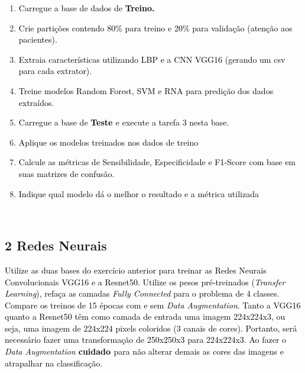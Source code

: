 \begin{enumerate}[series=listWWNumxxiv,label=\alph*),ref=\alph*]
\item \textcolor{black}{Carregue a base de dados de }\textbf{\textcolor{black}{Treino.}}\textcolor{black}{ }
\item \textcolor{black}{Crie partições contendo 80\% para treino e 20\% para validação (atenção aos
pacientes).}\textcolor{black}{ }
\item \textcolor{black}{Extraia características utilizando LBP e a CNN VGG16 (gerando um csv para cada
extrator).}\textcolor{black}{ }
\item \textcolor{black}{Treine modelos Random Forest, SVM e RNA para predição dos dados extraídos.}\textcolor{black}{ }
\item \textcolor{black}{Carregue a base de }\textbf{\textcolor{black}{Teste }}\textcolor{black}{ e execute a tarefa 3
nesta base.}\textcolor{black}{ }
\item \textcolor{black}{Aplique os modelos treinados nos dados de treino}\textcolor{black}{ }
\item \textcolor{black}{Calcule as métricas de Sensibilidade, Especificidade e F1-Score com base em suas matrizes de
confusão.}\textcolor{black}{ }
\item \textcolor{black}{Indique qual modelo dá o melhor o resultado e a métrica utilizada}\textcolor{black}{ }
\end{enumerate}
\textcolor{black}{ }

\subsection*{\textbf{2 Redes Neurais}}

\textcolor{black}{Utilize as duas bases do exercício anterior para treinar as Redes Neurais Convolucionais VGG16 e a
Resnet50. Utilize os pesos pré-treinados (}\textit{\textcolor{black}{Transfer Learning}}\textcolor{black}{), refaça as
camadas }\textit{\textcolor{black}{Fully Connected}}\textcolor{black}{ para o problema de 4 classes. Compare os treinos
de 15 épocas com e sem }\textit{\textcolor{black}{Data Augmentation}}\textcolor{black}{. Tanto a VGG16 quanto a
Resnet50 têm como camada de entrada uma imagem 224x224x3, ou seja, uma imagem de 224x224 pixels coloridos (3 canais de
cores). Portanto, será necessário fazer uma transformação de 250x250x3 para 224x224x3. Ao fazer o
}\textit{\textcolor{black}{Data Augmentation }}\textbf{\textit{\textcolor{black}{
}}}\textbf{\textcolor{black}{ cuidado }}\textcolor{black}{ para não alterar demais as cores das imagens e atrapalhar na
classificação.}\textcolor{black}{ }

